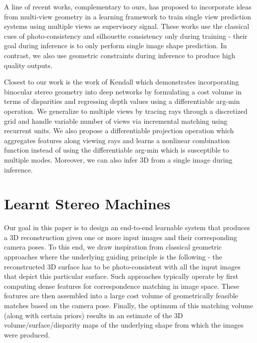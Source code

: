 \documentclass[../thesis.tex]{subfiles}
\begin{document}
A line of recent works, complementary to ours, has proposed to incorporate ideas from multi-view geometry in a learning framework to train single view prediction systems \cite{garg2016unsupervised,yan2016perspective,tulsiani2017multi,rezende2016unsupervised,zhou2017unsupervised} using multiple views as supervisory signal. These works use the classical cues of photo-consistency and silhouette consistency only during training - their goal during inference is to only perform single image shape prediction. In contrast, we also use geometric constraints during inference to produce high quality outputs.

Closest to our work is the work of Kendall \etal \cite{kendall2017end} which demonstrates incorporating binocular stereo geometry into deep networks by formulating a cost volume in terms of disparities and regressing depth values using a differentiable arg-min operation. We generalize to multiple views by tracing rays through a discretized grid and handle variable number of views via incremental matching using recurrent units. We also propose a differentiable projection operation which aggregates features along viewing rays and learns a nonlinear combination function instead of using the differentiable arg-min which is susceptible to multiple modes. Moreover, we can also infer 3D from a single image during inference.



\section{Learnt Stereo Machines}
Our goal in this paper is to design an end-to-end learnable system that produces a 3D reconstruction given one or more input images and their corresponding camera poses. To this end, we draw inspiration from classical geometric approaches where the underlying guiding principle is the following - the reconstructed 3D surface has to be photo-consistent with all the input images that depict this particular surface. Such approaches typically operate by first computing dense features for correspondence matching in image space. These features are then assembled into a large cost volume of geometrically feasible matches based on the camera pose. Finally, the optimum of this matching volume (along with certain priors) results in an estimate of the 3D volume/surface/disparity maps of the underlying shape from which the images were produced. 
\end{document}
